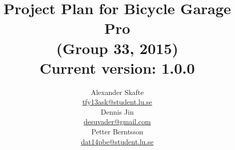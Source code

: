 \title{
	Project Plan for Bicycle Garage Pro\\
	(Group 33, 2015)\\
	\vspace{0.2in}
	\normalsize Current version: 1.0.0
}
\author{
	Alexander Skafte\\
	\url{tfy13ask@student.lu.se}\\
	Dennis Jin\\
	\url{desuvader@gmail.com}\\
	Petter Berntsson\\
	\url{dat14pbe@student.lu.se}\\
}
\date{}
